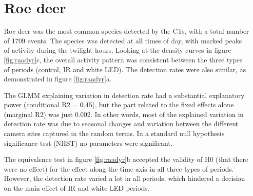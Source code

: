 \begin{table}[ht]  %

\caption[Model results]
{ \footnotesize 
Results of Poisson mixed effects models on detection rate of species at 56 different locations in southeastern Norway, with three different treatment levels interacting with time since deployment (Time); periods from sites unchanged through the the whole study period (Intercept), periods with only IR camera (IR), periods with an additional white LED camera (wLED). Random effects are location ID and week of year. %
}
\label{tab:param}
\footnotesize


\pagestyle{empty}
%


\clearpage %
\pagestyle{fancy}

\section{Roe deer}
Roe deer was the most common species detected by the CTs, with a total number of 1709 events.
The species was detected at all times of day, with marked peaks of activity during the twilight hours.
Looking at the density curves in figure \ref{fig:raadyr}c, the overall activity pattern was consistent between the three types of periods (control, IR and white LED). 
The detection rates were also similar, as demonstrated in figure \ref{fig:raadyr}a.

The GLMM explaining variation in detection rate had a substantial explanatory power (conditional R2 = 0.45), but the part related to the fixed effects alone (marginal R2) was just 0.002.
In other words, most of the explained variation in detection rate was due to seasonal changes and variation between the different camera sites captured in the random terms.
In a standard null hypothesis significance test (NHST) no parameters were significant.

The equivalence test in figure \ref{fig:raadyr}b accepted the validity of H0 (that there were no effect) for the effect along the time axis in all three types of periods.
However, the detection rate varied a lot in all periods, which hindered a decision on the main effect of IR and white LED periods. 



\end{table}
